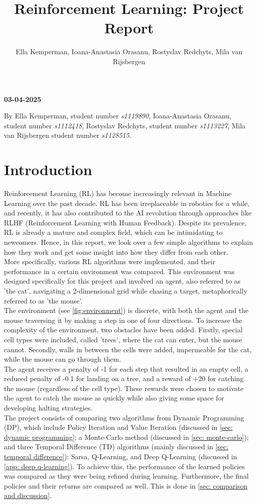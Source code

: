 \documentclass{class}
\title{Reinforcement Learning: Project Report}
\author{Ella Kemperman, Ioana-Anastasia Orasanu, Rostyslav Redchyts, Mila van Rijsbergen}
\newcommand{\makemytitle}{\begin{center}\Large\textbf{\THETITLE}\end{center}}
\begin{document}
\makemytitle
\begin{center}
    \textbf{03-04-2025}\\
\end{center}

\noindent By Ella Kemperman, student number \textit{s1119890}, Ioana-Anastasia Orasanu, student number \textit{s1112418}, Rostyslav Redchyts, student number \textit{s1113227}, Mila van Rijsbergen student number \textit{s1128515}.

\section{Introduction}
Reinforcement Learning (RL) has become increasingly relevant in Machine Learning over the past decade. RL has been irreplaceable in robotics for a while, and recently, it has also contributed to the AI revolution through approaches like RLHF (Reinforcement Learning with Human Feedback). Despite its prevalence, RL is already a mature and complex field, which can be intimidating to newcomers. Hence, in this report, we look over a few simple algorithms to explain how they work and get some insight into how they differ from each other.
\\ [0.3cm]
More specifically, various RL algorithms were implemented, and their performance in a certain environment was compared. This environment was designed specifically for this project and involved an agent, also referred to as 'the cat', navigating a 2-dimensional grid while chasing a target, metaphorically referred to as 'the mouse'.
\\[0.3cm]
The environment (see \autoref{fig:environment}) is discrete, with both the agent and the mouse traversing it by making a step in one of four directions. To increase the complexity of the environment, two obstacles have been added. Firstly, special cell types were included, called 'trees', where the cat can enter, but the mouse cannot. Secondly, walls in between the cells were added, impermeable for the cat, while the mouse can go through them. 
\\[0.3cm]
The agent receives a penalty of -1 for each step that resulted in an empty cell, a reduced penalty of -0.1 for landing on a tree, and a reward of +20 for catching the mouse (regardless of the cell type). These rewards were chosen to motivate the agent to catch the mouse as quickly while also giving some space for developing halting strategies.
\\[0.3cm]
The project consists of comparing two algorithms from Dynamic Programming (DP), which include Policy Iteration and Value Iteration (discussed in \autoref{sec: dynamic programming}; a Monte-Carlo method (discussed in \autoref{sec: monte-carlo}); and three Temporal Difference (TD) algorithms (mainly discussed in \autoref{sec: temporal difference}): Sarsa, Q-Learning, and Deep Q-Learning (discussed in \autoref{app: deep q-learning}). To achieve this, the performance of the learned policies was compared as they were being refined during learning. Furthermore, the final policies and their returns are compared as well. This is done in \autoref{sec: comparison and discussion}.
\end{document}
